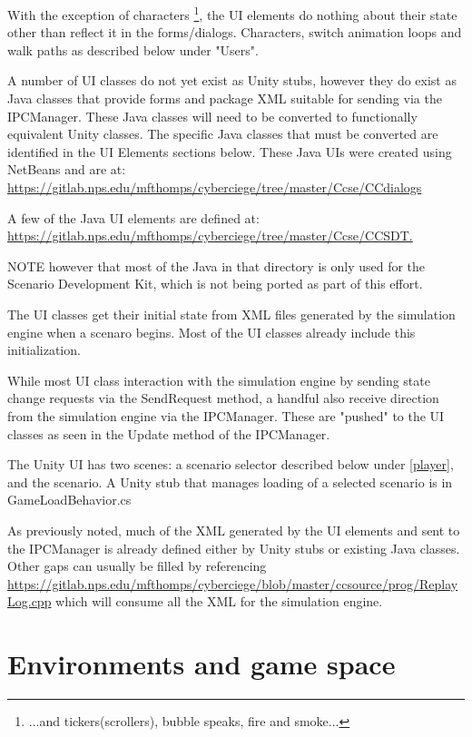 \documentclass{article}
\begin{document}
With the exception of characters \footnote{...and tickers(scrollers), bubble speaks, fire and smoke...}, 
the UI elements do nothing about their state other than reflect it in the
forms/dialogs.  Characters, switch animation loops and walk paths as described below under "Users".  

A number of UI classes do not yet exist as Unity stubs, however they do exist as Java classes that 
provide forms and package XML suitable for 
sending via the IPCManager.  These Java classes will need to be converted to functionally equivalent Unity classes.
The specific Java classes that must be converted are identified in the UI Elements sections below.
These Java UIs were created using NetBeans and are at: \linebreak \url{https://gitlab.nps.edu/mfthomps/cyberciege/tree/master/Ccse/CCdialogs}

A few of the Java UI elements are defined at: \linebreak \url{https://gitlab.nps.edu/mfthomps/cyberciege/tree/master/Ccse/CCSDT.}

NOTE however that most of the Java in that directory is only used for the Scenario Development Kit, which is not being 
ported as part of this effort.

The UI classes get their initial state from XML files generated by the simulation engine when a scenaro begins.  Most of the UI
classes already include this initialization.

While most UI class interaction with the simulation engine by sending state change requests via the SendRequest method,
a handful also receive direction from the simulation engine via the IPCManager.  These are "pushed" to the UI classes
as seen in the Update method of the IPCManager.

The Unity UI has two scenes: a scenario selector described below under \ref{player}, and the scenario.
A Unity stub that manages loading of a selected scenario is in GameLoadBehavior.cs

As previously noted, much of the XML generated by the UI elements and sent to the IPCManager is already defined either
by Unity stubs or existing Java classes.  Other gaps can usually be filled by referencing \newline
\url{https://gitlab.nps.edu/mfthomps/cyberciege/blob/master/ccsource/prog/ReplayLog.cpp}\newline
which will consume all the XML for the simulation engine.

\section {Environments and game space}
\end{document}
